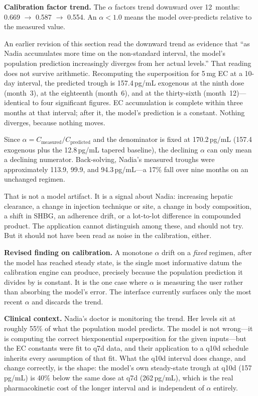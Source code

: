 \documentclass[11pt,a4paper]{article}
\begin{document}
\textbf{Calibration factor trend.} The $\alpha$ factors trend downward over
12~months: 0.669 $\rightarrow$ 0.587 $\rightarrow$ 0.554. An $\alpha < 1.0$
means the model over-predicts relative to the measured value.

An earlier revision of this section read the downward trend as evidence that
``as Nadia accumulates more time on the non-standard interval, the model's
population prediction increasingly diverges from her actual levels.'' That
reading does not survive arithmetic. Recomputing the superposition for
5\,mg EC at a 10-day interval, the predicted trough is 157.4\,pg/mL
exogenous at the ninth dose (month~3), at the eighteenth (month~6), and at
the thirty-sixth (month~12)---identical to four significant figures. EC
accumulation is complete within three months at that interval; after it,
the model's prediction is a constant. Nothing diverges, because nothing
moves.

Since $\alpha = C_{\text{measured}} / C_{\text{predicted}}$ and the
denominator is fixed at 170.2\,pg/mL (157.4 exogenous plus the 12.8\,pg/mL
tapered baseline), the declining $\alpha$ can only mean a declining
numerator. Back-solving, Nadia's measured troughs were approximately
113.9, 99.9, and 94.3\,pg/mL---a 17\% fall over nine months on an unchanged
regimen.

That is not a model artifact. It is a signal about Nadia: increasing hepatic
clearance, a change in injection technique or site, a change in body
composition, a shift in SHBG, an adherence drift, or a lot-to-lot difference
in compounded product. The application cannot distinguish among these, and
should not try. But it should not have been read as noise in the
calibration, either.

\textbf{Revised finding on calibration.} A monotone $\alpha$ drift on a
\emph{fixed} regimen, after the model has reached steady state, is the
single most informative datum the calibration engine can produce, precisely
because the population prediction it divides by is constant. It is the one
case where $\alpha$ is measuring the user rather than absorbing the model's
error. The interface currently surfaces only the most recent $\alpha$ and
discards the trend.

\textbf{Clinical context.} Nadia's doctor is monitoring the trend. Her
levels sit at roughly 55\% of what the population model predicts. The model
is not wrong---it is computing the correct biexponential superposition for
the given inputs---but the EC constants were fit to q7d data, and their
application to a q10d schedule inherits every assumption of that fit. What
the q10d interval does change, and change correctly, is the shape: the
model's own steady-state trough at q10d (157\,pg/mL) is 40\% below the same
dose at q7d (262\,pg/mL), which is the real pharmacokinetic cost of the
longer interval and is independent of $\alpha$ entirely.
\end{document}
